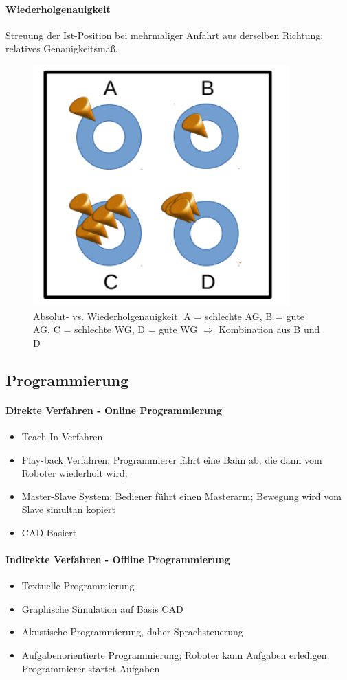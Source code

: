 \paragraph{Wiederholgenauigkeit}
Streuung der Ist-Position bei mehrmaliger Anfahrt aus derselben Richtung; relatives Genauigkeitsmaß.
\begin{figure}[H]
	\begin{center}
		\includegraphics[scale=0.6]{resources/PNG/Wiederholungsgenauigkeit.PNG}
		\caption{Absolut- vs. Wiederholgenauigkeit. A = schlechte AG, B = gute AG, C = schlechte WG, D = gute WG $\Rightarrow$ Kombination aus B und D} 
		\label{fig:resources/PNG/wiederholungsgenauigkeit.PNG}
	\end{center}
\end{figure}
\subsection{Programmierung}
\paragraph{Direkte Verfahren - Online Programmierung}
\begin{itemize}
	\item Teach-In Verfahren
	\item Play-back Verfahren; Programmierer fährt eine Bahn ab, die dann vom Roboter wiederholt wird;
	\item Master-Slave System; Bediener führt einen Masterarm; Bewegung wird vom Slave simultan kopiert
	\item CAD-Basiert
\end{itemize}
\paragraph{Indirekte Verfahren - Offline Programmierung}
\begin{itemize}
	\item Textuelle Programmierung
	\item Graphische Simulation auf Basis CAD
	\item Akustische Programmierung, daher Sprachsteuerung
	\item Aufgabenorientierte Programmierung; Roboter kann Aufgaben erledigen; Programmierer startet Aufgaben
\end{itemize}
